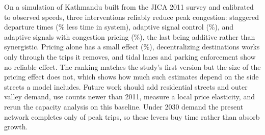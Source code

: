 On a simulation of Kathmandu built from the JICA 2011 survey and calibrated to observed speeds,
three interventions reliably reduce peak congestion: staggered departure times (\HSixTisMag\% less
time in system), adaptive signal control (\HOneTisMag\%), and adaptive signals with congestion
pricing (\HThreeTisMag\%), the last being additive rather than synergistic. Pricing alone has a
small effect (\HTwoTisMag\%), decentralizing destinations works only through the trips it removes,
and tidal lanes and parking enforcement show no reliable effect. The ranking matches the study's
first version but the size of the pricing effect does not, which shows how much such estimates
depend on the side streets a model includes. Future work should add residential streets and outer
valley demand, use counts newer than 2011, measure a local price elasticity, and rerun the capacity
analysis on this baseline. Under 2030 demand the present network completes only
\ProjThirtyComp{} of peak trips, so these levers buy time rather than absorb growth.
